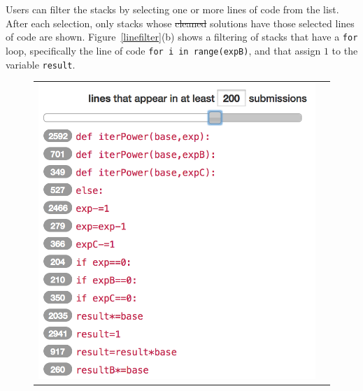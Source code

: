 \documentclass[12pt,twoside]{mitthesis}
\newcommand \codevar[1]{\texttt{#1}}
\providecommand{\DIFaddtex}[1]{{\protect\color{blue}\uwave{#1}}} %
\providecommand{\DIFdeltex}[1]{{\protect\color{red}\sout{#1}}}                      %
\providecommand{\DIFaddbegin}{} %
\providecommand{\DIFaddend}{} %
\providecommand{\DIFdelbegin}{} %
\providecommand{\DIFdelend}{} %
\providecommand{\DIFadd}[1]{\texorpdfstring{\DIFaddtex{#1}}{#1}} %
\providecommand{\DIFdel}[1]{\texorpdfstring{\DIFdeltex{#1}}{}} %
\begin{document}
{{{{{{{{{{Users can filter the stacks by selecting one or more lines of code from the list. After each selection, only stacks whose \DIFdelbegin \DIFdel{cleaned }\DIFdelend \DIFaddbegin \DIFadd{platonic }\DIFaddend solutions have those selected lines of code are shown. Figure~\ref{linefilter}(b) shows a filtering of stacks that have a \codevar{for} loop, specifically the line of code \codevar{for i in range(expB)}, and that assign $1$ to the variable \codevar{result}.

\begin{figure}[htpb]
\begin{tabular}{c | c}
\begin{minipage}{.48\linewidth}
\centering
\includegraphics[scale=0.5]{Body/figures/overcode/lineSlider.png}
\end{minipage}
&
\begin{minipage}{.52\linewidth}
\centering

\end{minipage}
\end{tabular}
\end{figure}}}}}}}}}}}
\end{document}

